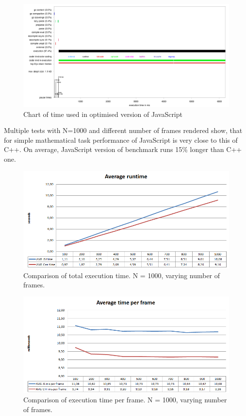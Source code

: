 \begin{figure}[h!]
  \caption{Chart of time used in optimised version of JavaScript}
  \label{img:spheres1profile}
  \centering
	\includegraphics[width=16cm]{spheres/spheres1-profile.png}
\end{figure} 

Multiple tests with N=1000 and different number of frames rendered show, that for simple mathematical task performance of JavaScript is very close to this of C++. On average, JavaScript version of benchmark runs 15\% longer than C++ one.

\begin{figure}[h!]
  \caption{Comparison of total execution time. N = 1000, varying number of frames.}
  \label{img:spheres1-time-total}
  \centering
	\includegraphics[width=16cm]{spheres/time-total.png}
\end{figure} 
\begin{figure}[h!]
  \caption{Comparison of execution time per frame. N = 1000, varying number of frames.}
  \label{img:spheres1-time-per-frame}
  \centering
	\includegraphics[width=16cm]{spheres/time-per-frame.png}
\end{figure}

